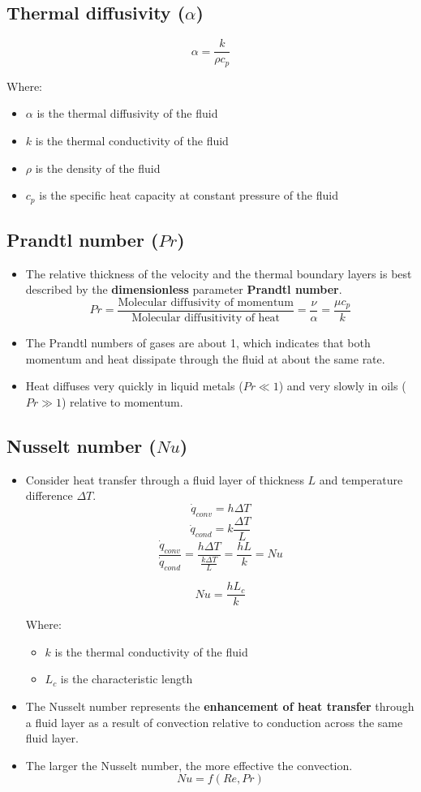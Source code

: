 \documentclass[11pt]{article}
\begin{document}
\subsection{Thermal diffusivity (\(\alpha\))}
\label{sec:orgd0600a1}
\[\alpha = \frac{k}{\rho c_p}\]

Where:
\begin{itemize}
\item \(\alpha\) is the thermal diffusivity of the fluid
\item \(k\) is the thermal conductivity of the fluid
\item \(\rho\) is the density of the fluid
\item \(c_p\) is the specific heat capacity at constant pressure of the fluid
\end{itemize}
\subsection{Prandtl number (\(Pr\))}
\label{sec:org398f969}
\begin{itemize}
\item The relative thickness of the velocity and the thermal boundary layers is best described by the \textbf{dimensionless} parameter \textbf{Prandtl number}.
\[Pr = \frac{\text{Molecular diffusivity of momentum}}{\text{Molecular diffusitivity of heat}} = \frac{\nu}{\alpha} = \frac{\mu c_p}{k}\]

\item The Prandtl numbers of gases are about 1, which indicates that both momentum and heat dissipate through the fluid at about the same rate.
\item Heat diffuses very quickly in liquid metals (\(Pr \ll 1\)) and very slowly in oils (\(Pr \gg 1\)) relative to momentum.
\end{itemize}

 \newpage
\subsection{Nusselt number (\(Nu\))}
\label{sec:orgfd46b88}
\begin{itemize}
\item Consider heat transfer through a fluid layer of thickness \(L\) and temperature difference \(\Delta T\).
\[\dot{q}_{conv} = h \Delta T\]
\[\dot{q}_{cond} = k \frac{\Delta T}{L}\]
\[\frac{\dot{q}_{conv}}{\dot{q}_{cond}} = \frac{h \Delta T}{\frac{k \Delta T}{L}} = \frac{hL}{k} = Nu\]

\[Nu = \frac{hL_c}{k}\]

Where:
\begin{itemize}
\item \(k\) is the thermal conductivity of the fluid
\item \(L_c\) is the characteristic length
\end{itemize}
\item The Nusselt number represents the \textbf{enhancement of heat transfer} through a fluid layer as a result of convection relative to conduction across the same fluid layer.
\item The larger the Nusselt number, the more effective the convection.
\[Nu = f(Re, Pr)\]
\end{itemize}
\end{document}

